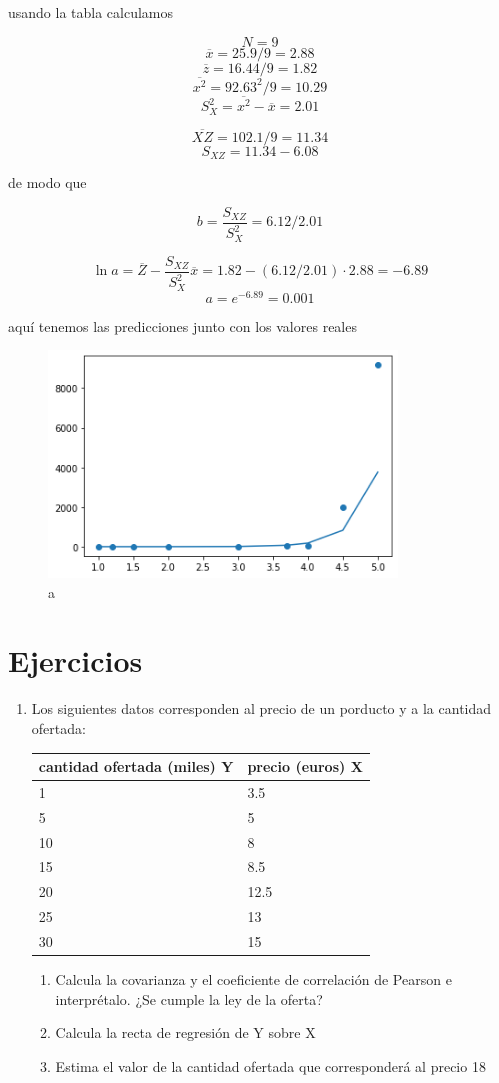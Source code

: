 \documentclass[
]{article}
\providecommand{\tightlist}{%
  \setlength{\itemsep}{0pt}\setlength{\parskip}{0pt}}
\begin{document}
usando la tabla calculamos

\[N=9\] \[\overline{x} = 25.9/9 = 2.88\]
\[\overline{z} = 16.44/9 = 1.82\] \[\overline{x^2}=92.63^2/9 = 10.29\]
\[S^2_X=\overline{x^2} - \overline{x} = 2.01\]

\[\overline{XZ} = 102.1/9 = 11.34\] \[S_{XZ}=11.34 - 6.08\]

de modo que

\[b = \frac{S_{XZ}}{S^2_X} = 6.12/2.01 \]

\[\ln a = \overline{Z} - \frac{S_{XZ}}{S^2_X} \overline x = 1.82 - (6.12/2.01)\cdot 2.88 = -6.89\]
\[a = e^{ -6.89} = 0.001\]

aquí tenemos las predicciones junto con los valores reales

\begin{figure}
\centering
\includegraphics[width=3.64583in,height=\textheight]{exponential_regression3.png}
\caption{a}
\end{figure}

\hypertarget{ejercicios}{%
\section{Ejercicios}\label{ejercicios}}

\begin{enumerate}
\def\labelenumi{\arabic{enumi}.}
\item
  Los siguientes datos corresponden al precio de un porducto y a la
  cantidad ofertada:

  \begin{longtable}[]{@{}ll@{}}
  \toprule
  cantidad ofertada (miles) Y & precio (euros) X\tabularnewline
  \midrule
  \endhead
  1 & 3.5\tabularnewline
  5 & 5\tabularnewline
  10 & 8\tabularnewline
  15 & 8.5\tabularnewline
  20 & 12.5\tabularnewline
  25 & 13\tabularnewline
  30 & 15\tabularnewline
  \bottomrule
  \end{longtable}

  \begin{enumerate}
  \def\labelenumii{\arabic{enumii}.}
  \tightlist
  \item
    Calcula la covarianza y el coeficiente de correlación de Pearson e
    interprétalo. ¿Se cumple la ley de la oferta?
  \item
    Calcula la recta de regresión de Y sobre X
  \item
    Estima el valor de la cantidad ofertada que corresponderá al precio
    18
  \end{enumerate}
\end{enumerate}
\end{document}
